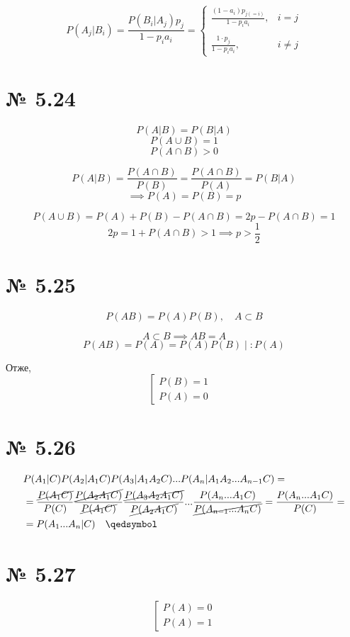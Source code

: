 \documentclass[11pt, a4paper]{article} %
\begin{document}
$$P(A_j|B_i) = \frac{P(B_i|A_j) p_j}{1 - p_i a_i} = \begin{cases}
    \displaystyle\frac{(1-a_i)p_{j(=i)}}{1 - p_i a_i}, & i=j\\
    \\
    \displaystyle\frac{1\cdot p_{j}}{1 - p_i a_i}, & i\ne j
\end{cases}$$

\section*{№ 5.24}
$$P(A|B) = P(B|A)$$
$$P(A\cup B) = 1$$
$$P(A \cap B) > 0$$

$$P(A|B) = \frac{P(A\cap B)}{P(B)} = \frac{P(A \cap B)}{P(A)} = P(B|A)$$
$$\implies P(A) = P(B) = p$$

$$P(A\cup B) = P(A) + P(B) - P(A\cap B) = 2p - P(A\cap B) = 1$$
$$2p = 1 + P(A\cap B) > 1 \implies p > \frac{1}{2}$$

\section*{№ 5.25}
$$P(AB) = P(A)P(B),\quad A \subset B$$

$$A \subset B \implies AB = A$$
$$P(AB) = P(A) = P(A)P(B) \;|\; :P(A)$$

Отже,
$$\left[\begin{array}{cc}
P(B) = 1 &\\
P(A) = 0 &
\end{array}
\right.$$

\section*{№ 5.26}
\begin{align*}
    & P(A_1 | C) P(A_2 | A_1 C) P(A_3 | A_1 A_2 C) ... P(A_n | A_1 A_2 ... A_{n-1} C) = \\ 
    &= \frac{\cancel{P(A_1 C)}}{P(C)} \frac{\cancel{P(A_2 A_1 C)}}{\cancel{P(A_1 C)}} 
    \frac{\cancel{P(A_3 A_2 A_1 C)}}{\cancel{P(A_2 A_1 C)}} ... \frac{P(A_n ... A_1 C)}{\cancel{P(A_{n-1} ... A_n C)}} 
    = \frac{P(A_n ... A_1 C)}{P(C)} = \\
    &= P(A_1 ... A_n | C) \quad \qedsymbol
\end{align*}

\section*{№ 5.27}
$$\left[\begin{array}{c}
    P(A) = 0 \\
    P(A) = 1
\end{array} \right.$$
\end{document}
